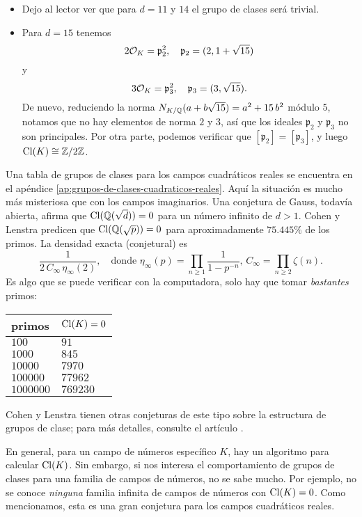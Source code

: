 \begin{ejemplo}
\begin{itemize}
  \item Dejo al lector ver que para $d = 11$ y $14$ el grupo de clases será
    trivial.

  \item Para $d = 15$ tenemos
    $$2\mathcal{O}_K = \mathfrak{p}_2^2, \quad \mathfrak{p}_2 = (2, 1 + \sqrt{15})$$
    y
    $$3\mathcal{O}_K = \mathfrak{p}_3^2, \quad \mathfrak{p}_3 = (3, \sqrt{15}).$$
    De nuevo, reduciendo la norma
    $N_{K/\mathbb{Q}} (a + b\sqrt{15}) = a^2 + 15\,b^2$ módulo $5$, notamos que
    no hay elementos de norma $2$ y $3$, así que los ideales $\mathfrak{p}_2$ y
    $\mathfrak{p}_3$ no son principales. Por otra parte, podemos verificar que
    $[\mathfrak{p}_2] = [\mathfrak{p}_3]$, y luego
    $\operatorname{Cl} (K) \cong \mathbb{Z}/2\mathbb{Z}$. \qedhere
  \end{itemize}
\end{ejemplo}

Una tabla de grupos de clases para los campos cuadráticos reales se encuentra
en el apéndice \ref{ap:grupos-de-clases-cuadraticos-reales}. Aquí la situación
es mucho más misteriosa que con los campos imaginarios. Una conjetura de Gauss,
todavía abierta, afirma que $\operatorname{Cl} (\mathbb{Q} (\sqrt{d})) = 0$ para un número infinito
de $d > 1$. Cohen y Lenstra predicen que $\operatorname{Cl} (\mathbb{Q} (\sqrt{p})) = 0$ para
aproximadamente $75.445\%$ de los primos.  La densidad exacta (conjetural) es
\[ \frac{1}{2\,C_\infty\,\eta_\infty (2)}, \quad \text{donde }
   \eta_\infty (p) = \prod_{n \ge 1} \frac{1}{1 - p^{-n}}, \,
    C_\infty = \prod_{n \ge 2} \zeta (n). \]
Es algo que se puede verificar con la computadora, solo hay que tomar
\emph{bastantes} primos:
\begin{center}
  \begin{tabular}{ll}
    primos & $\operatorname{Cl} (K) = 0$ \\
    \hline
    $100$    & $91$ \\
    $1000$   & $845$ \\
    $10000$  & $7970$ \\
    $100000$ & $77962$ \\
    $1000000$ & $769230$
  \end{tabular}
\end{center}
Cohen y Lenstra tienen otras conjeturas de este tipo sobre la estructura de
grupos de clase; para más detalles, consulte el artículo
\cite{Cohen-Lenstra-1984}.

\vspace{1em}

En general, para un campo de números específico $K$, hay un algoritmo para
calcular $\operatorname{Cl} (K)$. Sin embargo, si nos interesa el comportamiento de grupos de
clases para una familia de campos de números, no se sabe mucho. Por ejemplo, no
se conoce \emph{ninguna} familia infinita de campos de números con
$\operatorname{Cl} (K) = 0$. Como mencionamos, esta es una gran conjetura para los campos
cuadráticos reales.

